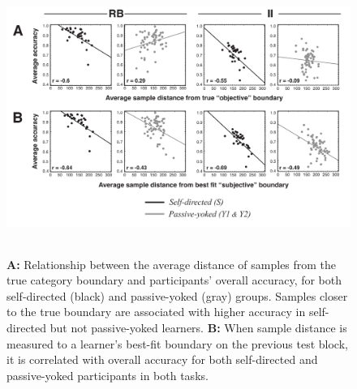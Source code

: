 \documentclass[3p,twocolumn,authoryear,10pt]{elsarticle}
\begin{document}
\begin{figure}[t]
\centerline{\includegraphics[height=3.5in]{figures/scatterplots_rev.pdf}}
\caption{
\textbf{A:} Relationship between the average distance of samples from the true category boundary and participants' overall accuracy, for both self-directed (black) and passive-yoked (gray) groups. Samples closer to the true boundary are associated with higher accuracy in self-directed but not passive-yoked learners. \textbf{B:} When sample distance is measured to a learner's best-fit boundary on the previous test block, it is correlated with overall accuracy for both self-directed and passive-yoked participants in both tasks.}
\label{scatterplots.fig}
\end{figure}


\end{document}
